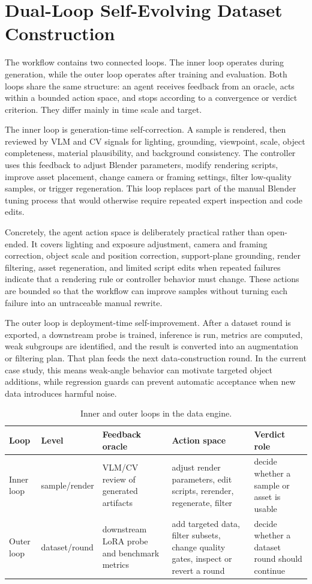 \section{Dual-Loop Self-Evolving Dataset Construction}
\label{sec:dual-loop}

The workflow contains two connected loops. The inner loop operates during generation, while the outer loop operates after training and evaluation. Both loops share the same structure: an agent receives feedback from an oracle, acts within a bounded action space, and stops according to a convergence or verdict criterion. They differ mainly in time scale and target.

The inner loop is generation-time self-correction. A sample is rendered, then reviewed by VLM and CV signals for lighting, grounding, viewpoint, scale, object completeness, material plausibility, and background consistency. The controller uses this feedback to adjust Blender parameters, modify rendering scripts, improve asset placement, change camera or framing settings, filter low-quality samples, or trigger regeneration. This loop replaces part of the manual Blender tuning process that would otherwise require repeated expert inspection and code edits.

Concretely, the agent action space is deliberately practical rather than open-ended. It covers lighting and exposure adjustment, camera and framing correction, object scale and position correction, support-plane grounding, render filtering, asset regeneration, and limited script edits when repeated failures indicate that a rendering rule or controller behavior must change. These actions are bounded so that the workflow can improve samples without turning each failure into an untraceable manual rewrite.

The outer loop is deployment-time self-improvement. After a dataset round is exported, a downstream probe is trained, inference is run, metrics are computed, weak subgroups are identified, and the result is converted into an augmentation or filtering plan. That plan feeds the next data-construction round. In the current case study, this means weak-angle behavior can motivate targeted object additions, while regression guards can prevent automatic acceptance when new data introduces harmful noise.

\begin{table}[t]
\centering
\small
\caption{Inner and outer loops in the data engine.}
\label{tab:dual-loop}
\begin{tabularx}{\linewidth}{l l X X X}
\toprule
Loop & Level & Feedback oracle & Action space & Verdict role \\
\midrule
Inner loop & sample/render & VLM/CV review of generated artifacts & adjust render parameters, edit scripts, rerender, regenerate, filter & decide whether a sample or asset is usable \\
Outer loop & dataset/round & downstream LoRA probe and benchmark metrics & add targeted data, filter subsets, change quality gates, inspect or revert a round & decide whether a dataset round should continue \\
\bottomrule
\end{tabularx}
\end{table}

